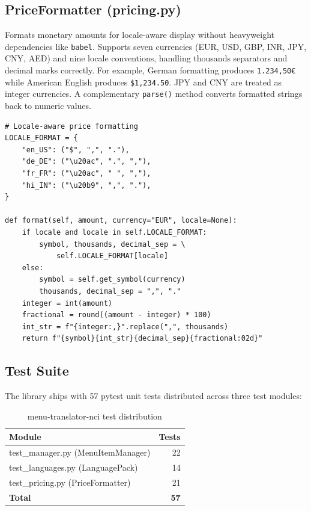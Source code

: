 \documentclass[conference]{IEEEtran}
\begin{document}
\subsection{PriceFormatter (pricing.py)}

Formats monetary amounts for locale-aware display without heavyweight dependencies like \texttt{babel}. Supports seven currencies (EUR, USD, GBP, INR, JPY, CNY, AED) and nine locale conventions, handling thousands separators and decimal marks correctly. For example, German formatting produces \texttt{1.234,50\euro} while American English produces \texttt{\$1,234.50}. JPY and CNY are treated as integer currencies. A complementary \texttt{parse()} method converts formatted strings back to numeric values.

\begin{lstlisting}[style=pycode]
# Locale-aware price formatting
LOCALE_FORMAT = {
    "en_US": ("$", ",", "."),
    "de_DE": ("\u20ac", ".", ","),
    "fr_FR": ("\u20ac", " ", ","),
    "hi_IN": ("\u20b9", ",", "."),
}

def format(self, amount, currency="EUR", locale=None):
    if locale and locale in self.LOCALE_FORMAT:
        symbol, thousands, decimal_sep = \
            self.LOCALE_FORMAT[locale]
    else:
        symbol = self.get_symbol(currency)
        thousands, decimal_sep = ",", "."
    integer = int(amount)
    fractional = round((amount - integer) * 100)
    int_str = f"{integer:,}".replace(",", thousands)
    return f"{symbol}{int_str}{decimal_sep}{fractional:02d}"
\end{lstlisting}

\subsection{Test Suite}

The library ships with 57 pytest unit tests distributed across three test modules:

\begin{table}[H]
\centering
\caption{menu-translator-nci test distribution}
\begin{tabular}{lr}
\toprule
\textbf{Module} & \textbf{Tests} \\
\midrule
test\_manager.py (MenuItemManager)  & 22 \\
test\_languages.py (LanguagePack)   & 14 \\
test\_pricing.py (PriceFormatter)   & 21 \\
\midrule
\textbf{Total} & \textbf{57} \\
\bottomrule
\end{tabular}
\end{table}
\end{document}
